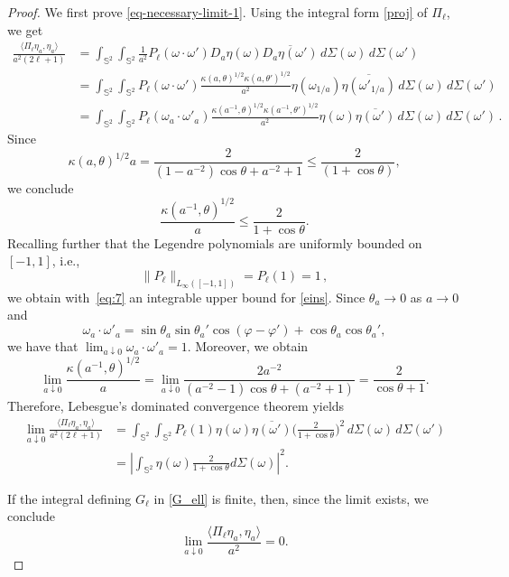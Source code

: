 \documentclass[a4paper,11pt,DIV=11,%
abstract=on%
]{scrartcl}
\newcommand{\red}[1]{#1}
\newcommand{\blue}[1]{#1}
\begin{document}
\begin{proof}
	\red{We first prove} \eqref{eq-necessary-limit-1}. Using the integral form \eqref{proj} of
	$\Pi_\ell$, we get
	\begin{align}
		\frac{\langle \Pi_\ell \eta_a , \eta_a \rangle}{a^2 (2\ell +1)} 
		&= 
		\int_{\mathbb S^2}\int_{ \mathbb S^2} \frac1{a^2} P_{\ell} (\omega\cdot \omega')
		D_a\eta(\omega) \overline{D_a\eta(\omega')}\, d\Sigma(\omega)\, d\Sigma(\omega')\\
		&=  \int_{\mathbb S^2}\int_{ \mathbb S^2}  P_{\ell} (\omega\cdot \omega')
		\frac{\kappa(a,\theta)^{1/2}\kappa(a,\theta')^{1/2}}{a^2}
		\eta(\omega_{1/a}) \overline{\eta(\omega'_{1/a})}\,d\Sigma(\omega) \, d\Sigma(\omega')\\
		&=  \int_{\mathbb S^2}\int_{ \mathbb S^2} P_{\ell} (\omega_a\cdot \omega'_a)
		\frac{\kappa(a^{-1},\theta)^{1/2}\kappa(a^{-1},\theta')^{1/2}}{a^2}
		\eta(\omega) \overline{\eta(\omega')}\,d\Sigma(\omega)\, d\Sigma(\omega')\,. \label{eins}
	\end{align}
	Since
	\begin{equation}\label{eq-aha}
	\red{\kappa(a,\theta)^{1/2}a=\frac{2}{(1-a^{-2})\cos\theta+a^{-2}+1}
	\leq\frac{2}{(1+\cos\theta)},}
	\end{equation}
	we conclude
	\begin{equation}\label{eq-kappa-est}
		\frac{\kappa(a^{-1},\theta)^{1/2}}{a} \leq \frac{2}{1+\cos\theta}.
	\end{equation}
	Recalling further that the Legendre polynomials are uniformly bounded on $[-1,1]$, i.e.,
	$$\|P_\ell\|_{L_\infty([-1,1])} = P_\ell(1) = 1\,,$$
	we obtain \red{with~\eqref{eq:7}} an integrable upper bound for \eqref{eins}.
	Since $\theta_a\to 0$ as $a\to 0$ and
	\[
	\omega_a \cdot \omega'_a
	= \sin\theta_a \sin\theta_a' \cos(\varphi-\varphi') + \cos\theta_a \cos\theta_a',
	\]
	we have that $\lim_{a\downarrow 0} \omega_a \cdot \omega'_a =1$. Moreover, we obtain
	\begin{equation} \label{kappa_2}
	\lim_{a\downarrow 0}  \frac{\kappa(a^{-1},\theta)^{1/2}}{a}
	= \lim_{a\downarrow 0}  \frac{2a^{-2}}{(a^{-2}-1)\cos\theta + (a^{-2}+1)}
	=  \frac{2}{\cos\theta +1}.
	\end{equation}
	Therefore, Lebesgue's dominated convergence theorem yields
	\begin{align*}
		\lim_{a\downarrow 0}\frac{\langle \Pi_\ell \eta_a , \eta_a \rangle}{a^2(2\ell +1)} 
		&= 
		\int_{\mathbb S^2}\int_{ \mathbb S^2} P_{\ell} (1) \eta(\omega) \overline{\eta(\omega')}
		\biggl(\frac{2}{1+\cos\theta}\biggr)^2\,d\Sigma(\omega)\,d\Sigma(\omega')\\
		&=\left|\int_{\mathbb S^2} \eta(\omega) \frac{2}{1+\cos\theta} d\Sigma(\omega)\right|^2.
	\end{align*}
        \red{
If the integral defining $G_\ell$ in \eqref{G_ell} is finite, \blue{then, since
the limit exists, we conclude}}
	\begin{equation*}%
		\lim_{a\downarrow 0}\frac{\langle \Pi_\ell \eta_a , \eta_a \rangle}{a^2}=0.
		\tag*{\qedhere}
	\end{equation*}
\end{proof}
\end{document}
